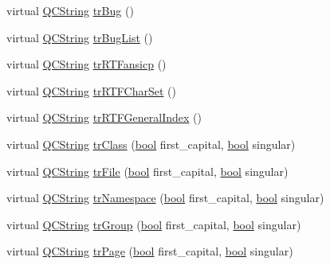 \begin{DoxyCompactItemize}
\item 
virtual \hyperlink{class_q_c_string}{Q\+C\+String} \hyperlink{class_translator_norwegian_aef08a3603e15397c3ba2d1f2c1acb446}{tr\+Bug} ()
\item 
virtual \hyperlink{class_q_c_string}{Q\+C\+String} \hyperlink{class_translator_norwegian_a9d04b3b040287b449284f228ba50dd92}{tr\+Bug\+List} ()
\item 
virtual \hyperlink{class_q_c_string}{Q\+C\+String} \hyperlink{class_translator_norwegian_a53fc2ec893e9135938981db15869f645}{tr\+R\+T\+Fansicp} ()
\item 
virtual \hyperlink{class_q_c_string}{Q\+C\+String} \hyperlink{class_translator_norwegian_a016327548c204763cf56e4fea6e4ad77}{tr\+R\+T\+F\+Char\+Set} ()
\item 
virtual \hyperlink{class_q_c_string}{Q\+C\+String} \hyperlink{class_translator_norwegian_a763dc30e34241a86cb4c9d491c7ec5e6}{tr\+R\+T\+F\+General\+Index} ()
\item 
virtual \hyperlink{class_q_c_string}{Q\+C\+String} \hyperlink{class_translator_norwegian_ab275874b6bcba054f4ec80882fc5702a}{tr\+Class} (\hyperlink{qglobal_8h_a1062901a7428fdd9c7f180f5e01ea056}{bool} first\+\_\+capital, \hyperlink{qglobal_8h_a1062901a7428fdd9c7f180f5e01ea056}{bool} singular)
\item 
virtual \hyperlink{class_q_c_string}{Q\+C\+String} \hyperlink{class_translator_norwegian_acca696930b1f69826a09951a73821da6}{tr\+File} (\hyperlink{qglobal_8h_a1062901a7428fdd9c7f180f5e01ea056}{bool} first\+\_\+capital, \hyperlink{qglobal_8h_a1062901a7428fdd9c7f180f5e01ea056}{bool} singular)
\item 
virtual \hyperlink{class_q_c_string}{Q\+C\+String} \hyperlink{class_translator_norwegian_ab644f977790ca08fbe30dafdd38f2811}{tr\+Namespace} (\hyperlink{qglobal_8h_a1062901a7428fdd9c7f180f5e01ea056}{bool} first\+\_\+capital, \hyperlink{qglobal_8h_a1062901a7428fdd9c7f180f5e01ea056}{bool} singular)
\item 
virtual \hyperlink{class_q_c_string}{Q\+C\+String} \hyperlink{class_translator_norwegian_ae1755967842766f8fc246e1afd7964c2}{tr\+Group} (\hyperlink{qglobal_8h_a1062901a7428fdd9c7f180f5e01ea056}{bool} first\+\_\+capital, \hyperlink{qglobal_8h_a1062901a7428fdd9c7f180f5e01ea056}{bool} singular)
\item 
virtual \hyperlink{class_q_c_string}{Q\+C\+String} \hyperlink{class_translator_norwegian_a9b294332989e3394163b0631a9f09759}{tr\+Page} (\hyperlink{qglobal_8h_a1062901a7428fdd9c7f180f5e01ea056}{bool} first\+\_\+capital, \hyperlink{qglobal_8h_a1062901a7428fdd9c7f180f5e01ea056}{bool} singular)

\end{DoxyCompactItemize}
